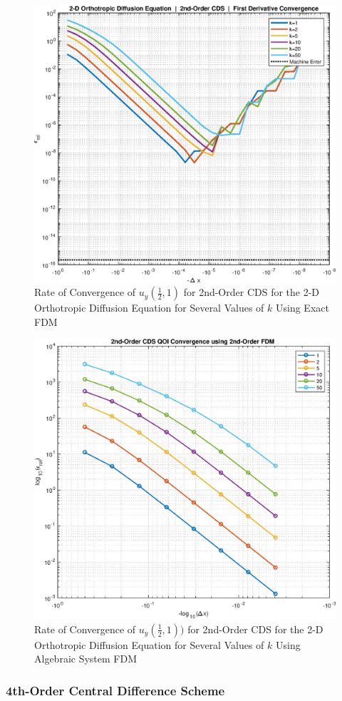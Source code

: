 \documentclass[10pt]{article}		%
\numberwithin{equation}{section}
\begin{document}
\begin{figure}[H]
	\begin{center}
		\includegraphics[width = 0.5\linewidth]{2ddiff2oconv}
		\caption{Rate of Convergence of $u_y(\tfrac{1}{2},1)$ for 2nd-Order CDS for the 2-D Orthotropic Diffusion Equation for Several Values of $k$ Using Exact FDM}	
	\end{center}
\end{figure}

\begin{figure}[H]
	\begin{center}
		\includegraphics[width = 0.5\linewidth]{order_2_u_y_fdm}
		\caption{Rate of Convergence of $u_y(\tfrac{1}{2},1))$ for 2nd-Order CDS for the 2-D Orthotropic Diffusion Equation for Several Values of $k$ Using Algebraic System FDM}	
	\end{center}
\end{figure}

\subsubsection{4th-Order Central Difference Scheme}
\end{document}
